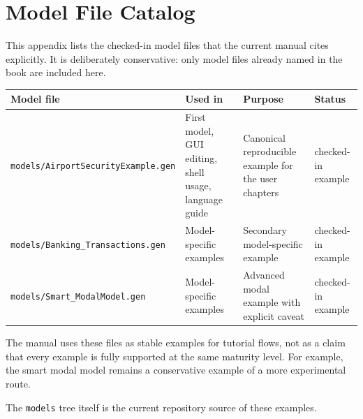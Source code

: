 \chapter{Model File Catalog}
\label{chap:appendix-model-file-catalog}

This appendix lists the checked-in model files that the current manual cites
explicitly. It is deliberately conservative: only model files already named in
the book are included here. 

\begin{table}[htbp]
\centering
\small
\begin{tabular}{|p{4.3cm}|p{3.7cm}|p{3.7cm}|p{2.0cm}|}
\hline
\textbf{Model file} & \textbf{Used in} & \textbf{Purpose} & \textbf{Status} \\
\hline
\texttt{models/AirportSecurityExample.gen} & First model, GUI editing, shell usage, language guide & Canonical reproducible example for the user chapters & checked-in example \\
\hline
\texttt{models/Banking\_Transactions.gen} & Model-specific examples & Secondary model-specific example & checked-in example \\
\hline
\texttt{models/Smart\_ModalModel.gen} & Model-specific examples & Advanced modal example with explicit caveat & checked-in example \\
\hline
\end{tabular}
\end{table}

The manual uses these files as stable examples for tutorial flows, not as a
claim that every example is fully supported at the same maturity level. For
example, the smart modal model remains a conservative example of a more
experimental route.

The \texttt{models} tree itself is the current repository source of these
examples. 
